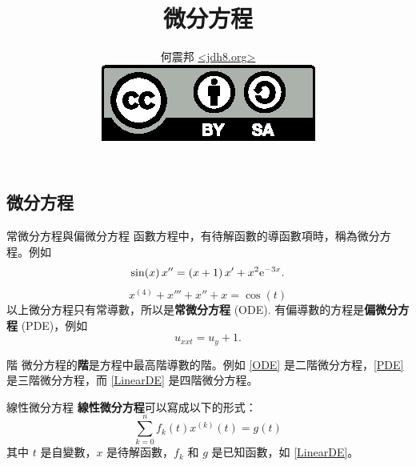 \documentclass{beamer}
\title{微分方程}
\author[何震邦]{何震邦 \href{http://jdh8.org/}{\textless jdh8.org\textgreater}\\
    \href{http://creativecommons.org/licenses/by-sa/3.0/tw/deed.zh\textunderscore TW}{\includegraphics{by-sa.eps}}}
\newcommand  {\e}{\textup e}
\newcommand{\negskip}{\vskip -2em plus 3pt minus 3pt}
\theoremstyle{remark}
\begin{document}
\begin{CJK}{UTF8}{bsmi}
\maketitle

\section{微分方程}
\begin{frame}{常微分方程與偏微分方程}
  函數方程中，有待解函數的導函數項時，稱為微分方程。例如
  \begin{equation}
    \sin(x)\,x'' = \left( x + 1 \right) x' + x^2 \e^{-3x}. \label{ODE}
  \end{equation}
  \begin{equation}
    x^{(4)} + x''' + x'' + x = \cos(t) \label{LinearDE}
  \end{equation}
  以上微分方程只有常導數，所以是\textbf{常微分方程} (ODE).
  有偏導數的方程是\textbf{偏微分方程} (PDE)，例如
  \begin{equation}
    u_{xxt} = u_y + 1. \label{PDE}
  \end{equation}
\end{frame}

\begin{frame}{階}
  微分方程的\textbf{階}是方程中最高階導數的階。例如 \eqref{ODE}
  是二階微分方程，\eqref{PDE} 是三階微分方程，而 \eqref{LinearDE}
  是四階微分方程。
\end{frame}

\begin{frame}{線性微分方程}
  \textbf{線性微分方程}可以寫成以下的形式：
  \[ \sum_{k=0}^n f_k(t) x^{(k)}(t) = g(t) \]
  其中 $t$ 是自變數，$x$ 是待解函數，$f_k$ 和 $g$ 是已知函數，如
  \eqref{LinearDE}。
\end{frame}



\end{CJK}
\end{document}

